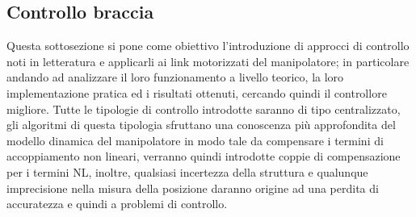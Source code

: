 \subsection{Controllo braccia}
Questa sottosezione si pone come obiettivo l'introduzione di approcci di controllo noti in letteratura e applicarli ai link motorizzati del manipolatore; in particolare andando ad analizzare il loro funzionamento a livello teorico, la loro implementazione pratica ed i risultati ottenuti, cercando quindi il controllore migliore. Tutte le tipologie di controllo introdotte saranno di tipo centralizzato, gli algoritmi di questa tipologia sfruttano una conoscenza più approfondita del modello dinamica del manipolatore in modo tale da compensare i termini di accoppiamento non lineari, verranno quindi introdotte coppie di compensazione per i termini NL, inoltre, qualsiasi incertezza della struttura e qualunque imprecisione nella misura della posizione daranno origine ad una perdita di accuratezza e quindi a problemi di controllo. %
